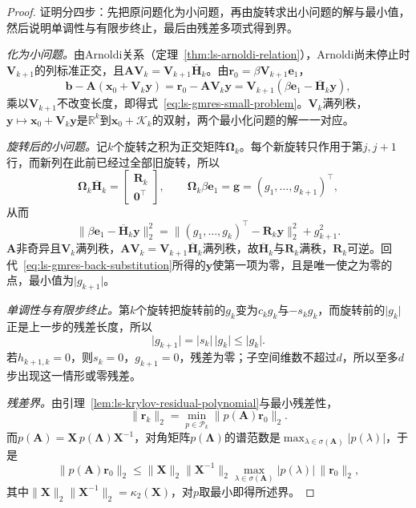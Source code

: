 \begin{proof}
证明分四步：先把原问题化为小问题，再由旋转求出小问题的解与最小值，然后说明单调性与有限步终止，最后由残差多项式得到界。

\emph{化为小问题。}由Arnoldi关系（定理~\ref{thm:ls-arnoldi-relation}），Arnoldi尚未停止时$\bm V_{k+1}$的列标准正交，且$\bm A\bm V_k=\bm V_{k+1}\overline{\bm H}_k$。由$\bm r_0=\beta\bm V_{k+1}\bm e_1$，
\[
 \bm b-\bm A(\bm x_0+\bm V_k\bm y)=\bm r_0-\bm A\bm V_k\bm y=\bm V_{k+1}(\beta\bm e_1-\overline{\bm H}_k\bm y),
\]
乘以$\bm V_{k+1}$不改变长度，即得式~\eqref{eq:ls-gmres-small-problem}。$\bm V_k$满列秩，$\bm y\mapsto\bm x_0+\bm V_k\bm y$是$\mathbb R^k$到$\bm x_0+\mathcal K_k$的双射，两个最小化问题的解一一对应。

\emph{旋转后的小问题。}记$k$个旋转之积为正交矩阵$\bm\Omega_k$。每个新旋转只作用于第$j,j+1$行，而新列在此前已经过全部旧旋转，所以
\[
 \bm\Omega_k\overline{\bm H}_k=\begin{bmatrix}\bm R_k\\\bm 0^\top\end{bmatrix},\qquad
 \bm\Omega_k\beta\bm e_1=\bm g=(g_1,\ldots,g_{k+1})^\top ,
\]
从而
\[
 \lVert\beta\bm e_1-\overline{\bm H}_k\bm y\rVert_2^2
 =\lVert(g_1,\ldots,g_k)^\top-\bm R_k\bm y\rVert_2^2+g_{k+1}^2 .
\]
$\bm A$非奇异且$\bm V_k$满列秩，$\bm A\bm V_k=\bm V_{k+1}\overline{\bm H}_k$满列秩，故$\overline{\bm H}_k$与$\bm R_k$满秩，$\bm R_k$可逆。回代~\eqref{eq:ls-gmres-back-substitution}所得的$\bm y$使第一项为零，且是唯一使之为零的点，最小值为$\lvert g_{k+1}\rvert$。

\emph{单调性与有限步终止。}第$k$个旋转把旋转前的$g_k$变为$c_kg_k$与$-s_kg_k$，而旋转前的$\lvert g_k\rvert$正是上一步的残差长度，所以
\[
 \lvert g_{k+1}\rvert=\lvert s_k\rvert\,\lvert g_k\rvert\le\lvert g_k\rvert .
\]
若$h_{k+1,k}=0$，则$s_k=0$，$g_{k+1}=0$，残差为零；子空间维数不超过$d$，所以至多$d$步出现这一情形或零残差。

\emph{残差界。}由引理~\ref{lem:ls-krylov-residual-polynomial}与最小残差性，
\[
 \lVert\bm r_k\rVert_2=\min_{p\in\mathcal P_k}\lVert p(\bm A)\bm r_0\rVert_2 .
\]
而$p(\bm A)=\bm X\,p(\bm\Lambda)\bm X^{-1}$，对角矩阵$p(\bm\Lambda)$的谱范数是$\max_{\lambda\in\sigma(\bm A)}\lvert p(\lambda)\rvert$，于是
\[
 \lVert p(\bm A)\bm r_0\rVert_2\le\lVert\bm X\rVert_2\lVert\bm X^{-1}\rVert_2\max_{\lambda\in\sigma(\bm A)}\lvert p(\lambda)\rvert\,\lVert\bm r_0\rVert_2 ,
\]
其中$\lVert\bm X\rVert_2\lVert\bm X^{-1}\rVert_2=\kappa_2(\bm X)$，对$p$取最小即得所述界。
\end{proof}

